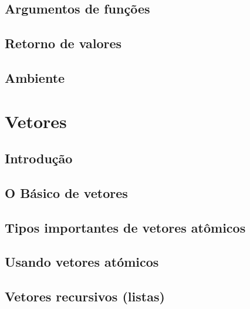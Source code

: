 \documentclass[
]{latex/krantz}
\theoremstyle{definition}
\theoremstyle{definition}
\theoremstyle{definition}
\theoremstyle{definition}
\theoremstyle{remark}
\begin{document}
\hypertarget{argumentos-de-funuxe7uxf5es}{%
\section{Argumentos de funções}\label{argumentos-de-funuxe7uxf5es}}

\hypertarget{retorno-de-valores}{%
\section{Retorno de valores}\label{retorno-de-valores}}

\hypertarget{ambiente}{%
\section{Ambiente}\label{ambiente}}

\hypertarget{vetores}{%
\chapter{Vetores}\label{vetores}}

\hypertarget{introduuxe7uxe3o-12}{%
\section{Introdução}\label{introduuxe7uxe3o-12}}

\hypertarget{o-buxe1sico-de-vetores}{%
\section{O Básico de vetores}\label{o-buxe1sico-de-vetores}}

\hypertarget{tipos-importantes-de-vetores-atuxf4micos}{%
\section{Tipos importantes de vetores atômicos}\label{tipos-importantes-de-vetores-atuxf4micos}}

\hypertarget{usando-vetores-atuxf3micos}{%
\section{Usando vetores atómicos}\label{usando-vetores-atuxf3micos}}

\hypertarget{vetores-recursivos-listas}{%
\section{Vetores recursivos (listas)}\label{vetores-recursivos-listas}}
\end{document}
